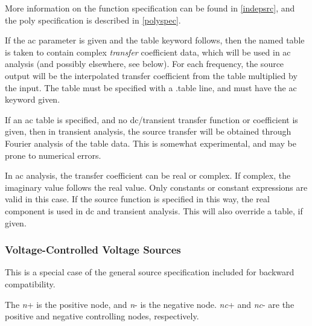 More information on the function specification can be found in
\ref{indepsrc}, and the {\vt poly} specification is described in
\ref{polyspec}.

If the {\vt ac} parameter is given and the {\vt table} keyword
follows, then the named table is taken to contain complex {\it
transfer} coefficient data, which will be used in ac analysis (and
possibly elsewhere, see below).  For each frequency, the source output
will be the interpolated transfer coefficient from the table
multiplied by the input.  The table must be specified with a {\vt
.table} line, and must have the {\vt ac} keyword given.

If an ac table is specified, and no dc/transient transfer function or
coefficient is given, then in transient analysis, the source transfer
will be obtained through Fourier analysis of the table data.  This is
somewhat experimental, and may be prone to numerical errors.

In ac analysis, the transfer coefficient can be real or complex.  If
complex, the imaginary value follows the real value.  Only constants
or constant expressions are valid in this case.  If the source
function is specified in this way, the real component is used in dc
and transient analysis.  This will also override a table, if given.

\subsubsection{Voltage-Controlled Voltage Sources}


This is a special case of the general source specification included
for backward compatibility.


The {\it n\/}{\vt +} is the positive node, and {\it n\/}{\vt -} is the
negative node.  {\it nc\/}{\vt +} and {\it nc\/}{\vt -} are the
positive and negative controlling nodes, respectively.

